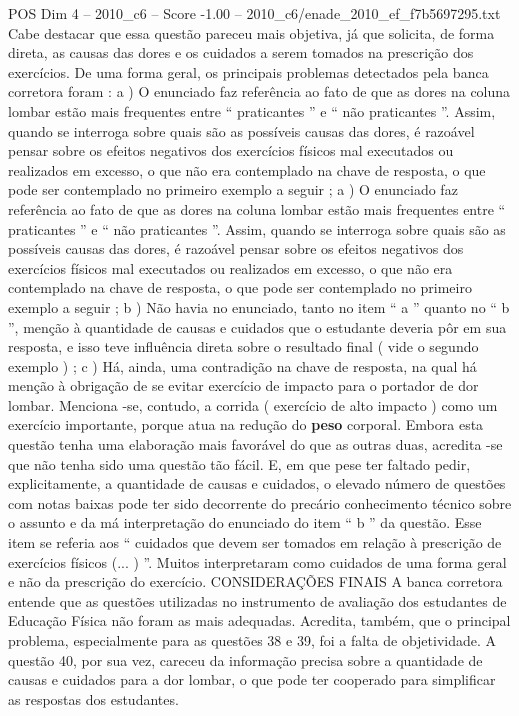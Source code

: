 \begin{textsample}{POS Dim 4 – 2010\_c6 – Score -1.00 – 2010\_c6/enade\_2010\_ef\_f7b5697295.txt}
Cabe destacar que essa questão pareceu mais objetiva, já que solicita, de forma direta, as causas das dores e os cuidados a serem tomados na prescrição dos exercícios.
De uma forma geral, os principais problemas detectados pela banca corretora foram : a ) O enunciado faz referência ao fato de que as dores na coluna lombar estão mais frequentes entre “ praticantes ” e “ não praticantes ”.
Assim, quando se interroga sobre quais são as possíveis causas das dores, é razoável pensar sobre os efeitos negativos dos exercícios físicos mal executados ou realizados em excesso, o que não era contemplado na chave de resposta, o que pode ser contemplado no primeiro exemplo a seguir ; a ) O enunciado faz referência ao fato de que as dores na coluna lombar estão mais frequentes entre “ praticantes ” e “ não praticantes ”.
Assim, quando se interroga sobre quais são as possíveis causas das dores, é razoável pensar sobre os efeitos negativos dos exercícios físicos mal executados ou realizados em excesso, o que não era contemplado na chave de resposta, o que pode ser contemplado no primeiro exemplo a seguir ; b ) Não havia no enunciado, tanto no item “ a ” quanto no “ b ”, menção à quantidade de causas e cuidados que o estudante deveria pôr em sua resposta, e isso teve influência direta sobre o resultado final ( vide o segundo exemplo ) ; c ) Há, ainda, uma contradição na chave de resposta, na qual há menção à obrigação de se evitar exercício de impacto para o portador de dor lombar.
Menciona -se, contudo, a corrida ( exercício de alto impacto ) como um exercício importante, porque atua na redução do \textbf{peso} corporal.
Embora esta questão tenha uma elaboração mais favorável do que as outras duas, acredita -se que não tenha sido uma questão tão fácil.
E, em que pese ter faltado pedir, explicitamente, a quantidade de causas e cuidados, o elevado número de questões com notas baixas pode ter sido decorrente do precário conhecimento técnico sobre o assunto e da má interpretação do enunciado do item “ b ” da questão.
Esse item se referia aos “ cuidados que devem ser tomados em relação à prescrição de exercícios físicos (... ) ”.
Muitos interpretaram como cuidados de uma forma geral e não da prescrição do exercício.
CONSIDERAÇÕES FINAIS A banca corretora entende que as questões utilizadas no instrumento de avaliação dos estudantes de Educação Física não foram as mais adequadas.
Acredita, também, que o principal problema, especialmente para as questões 38 e 39, foi a falta de objetividade.
A questão 40, por sua vez, careceu da informação precisa sobre a quantidade de causas e cuidados para a dor lombar, o que pode ter cooperado para simplificar as respostas dos estudantes.

\end{textsample}
